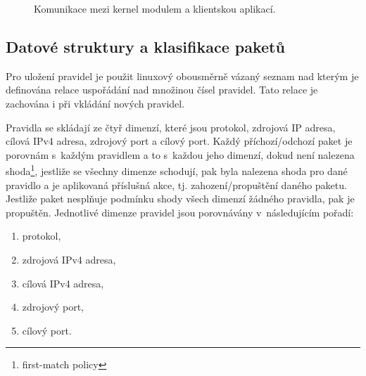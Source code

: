 \documentclass[10pt,a4paper,notitlepage]{article}
\begin{document}
\begin{figure}[h]	%
\centering %
\caption{Komunikace mezi kernel modulem a klientskou aplikací.}
\label{pic:2}
\end{figure}

\subsection{Datové struktury a klasifikace paketů}
Pro uložení pravidel je použit linuxový obousměrně vázaný seznam nad kterým je
definována relace uspořádání nad množinou čísel pravidel. Tato relace je
zachována i při vkládání nových pravidel.

Pravidla se skládají ze čtyř dimenzí, které jsou protokol, zdrojová IP adresa,
cílová IPv4 adresa, zdrojový port a cílový port. Každý příchozí/odchozí paket je
porovnám s~každým pravidlem a to s~každou jeho dimenzí, dokud není nalezena
shoda\footnote{first-match policy}, jestliže se všechny
dimenze schodují, pak byla nalezena shoda pro dané pravidlo a je aplikovaná
příslušná akce, tj. zahození/propuštění daného paketu. Jestliže paket nesplňuje
podmínku shody všech dimenzí žádného pravidla, pak je propuštěn. Jednotlivé
dimenze pravidel jsou porovnávány v~následujícím pořadí:

\begin{enumerate}
  \item protokol,
  \item zdrojová IPv4 adresa,
  \item cílová IPv4 adresa,
  \item zdrojový port,
  \item cílový port.
\end{enumerate}
\end{document}
